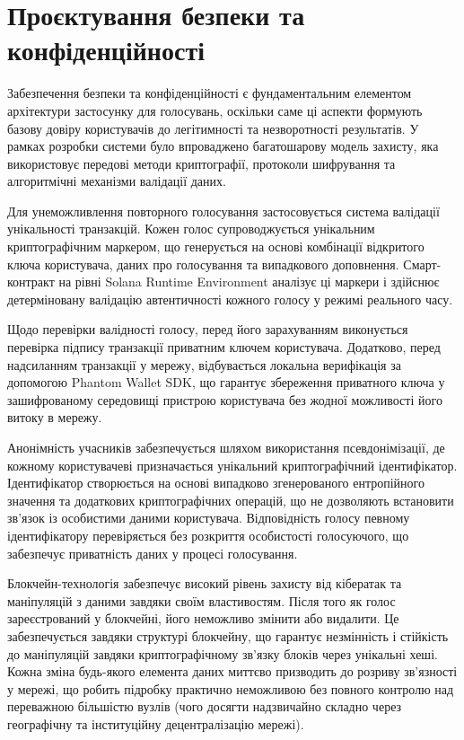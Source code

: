 \documentclass[14pt]{extreport}
\begin{document}
  \section{Проєктування безпеки та конфіденційності}
  
  Забезпечення безпеки та конфіденційності є фундаментальним елементом архітектури застосунку для голосувань, оскільки саме ці аспекти формують базову довіру користувачів до легітимності та незворотності результатів. У рамках розробки системи було впроваджено багатошарову модель захисту, яка використовує передові методи криптографії, протоколи шифрування та алгоритмічні механізми валідації даних.

  Для унеможливлення повторного голосування застосовується система валідації унікальності транзакцій. Кожен голос супроводжується унікальним криптографічним маркером, що генерується на основі комбінації відкритого ключа користувача, даних про голосування та випадкового доповнення. Смарт-контракт на рівні Solana Runtime Environment аналізує ці маркери і здійснює детерміновану валідацію автентичності кожного голосу у режимі реального часу.

  Щодо перевірки валідності голосу, перед його зарахуванням виконується перевірка підпису транзакції приватним ключем користувача. Додатково, перед надсиланням транзакції у мережу, відбувається локальна верифікація за допомогою Phantom Wallet SDK, що гарантує збереження приватного ключа у зашифрованому середовищі пристрою користувача без жодної можливості його витоку в мережу.

  Анонімність учасників забезпечується шляхом використання псевдонімізації, де кожному користувачеві призначається унікальний криптографічний ідентифікатор. Ідентифікатор створюється на основі випадково згенерованого ентропійного значення та додаткових криптографічних операцій, що не дозволяють встановити зв'язок із особистими даними користувача. Відповідність голосу певному ідентифікатору перевіряється без розкриття особистості голосуючого, що забезпечує приватність даних у процесі голосування.
  
  Блокчейн-технологія забезпечує високий рівень захисту від кібератак та маніпуляцій з даними завдяки своїм властивостям. Після того як голос зареєстрований у блокчейні, його неможливо змінити або видалити. Це забезпечується завдяки структурі блокчейну, що гарантує незмінність і стійкість до маніпуляцій завдяки криптографічному зв'язку блоків через унікальні хеші. Кожна зміна будь-якого елемента даних миттєво призводить до розриву зв'язності у мережі, що робить підробку практично неможливою без повного контролю над переважною більшістю вузлів (чого досягти надзвичайно складно через географічну та інституційну децентралізацію мережі).
  
\end{document}
